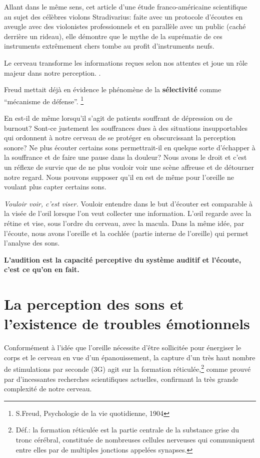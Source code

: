 Allant dans le même sens, cet 
article d'une 
étude franco-américaine scientifique
\autocite{fritz_stradivarius} au sujet des célèbres violons
Stradivarius: faite avec un protocole 
d'écoutes en aveugle avec
des violonistes professionnels et en parallèle avec un public (caché
derrière un rideau), elle démontre que le mythe de la suprématie
de ces instruments extrêmement chers tombe au profit d'instruments
neufs.

Le cerveau 
transforme les informations reçues selon nos attentes et joue un
rôle majeur dans notre perception.
\autocite{lemonde.fr:stradivarius}.
% 
\autocite[p. 43]{roque:lecoute}


 Freud mettait déjà en évidence le phénomène de la
\textbf{sélectivité }comme ``mécanisme de défense''. \footnote{S.Freud,
  Psychologie de la vie quotidienne, 1904}

En est-il de même lorsqu'il s'agit de patients souffrant de dépression
ou de burnout? Sont-ce justement les souffrances dues à des situations
insupportables qui
ordonnent à notre cerveau de se protéger en obscurcissant la
perception sonore?  Ne plus écouter certains
sons permettrait-il en quelque sorte d'échapper à la souffrance et de faire une
pause dans la douleur? Nous avons le droit et c'est un réflexe de
survie que de ne plus vouloir voir une scène affreuse et de détourner
notre regard. Nous pouvons supposer qu'il en est de même pour l'oreille ne voulant plus capter
certains sons.


 \emph{Vouloir voir, c'est viser.}  Vouloir entendre dans le but d'écouter est comparable  à
la visée de l'\oe il lorsque l'on veut collecter une
information. L'\oe il regarde avec la rétine et  vise, sous l'ordre du
cerveau, avec la macula. Dans la même idée, par l'écoute, nous avons
l'oreille et la cochlée (partie interne de l'oreille) qui permet
l'analyse des sons.




 \textbf{ L'audition est la capacité perceptive du système auditif et l'écoute, c'est ce qu'on en fait.}


\section{La perception des sons et l'existence de troubles
  émotionnels}


Conformément à l'idée que l'oreille nécessite d'être sollicitée pour
énergiser le corps et le cerveau en vue d'un épanouissement, la
capture d'un très haut nombre de stimulations par seconde (3G) agit
sur la formation réticulée,\footnote{Déf.: la formation 
réticulée est la partie centrale de la substance grise du tronc cérébral, 
constituée de nombreuses cellules nerveuses qui communiquent entre elles par de 
multiples jonctions appelées synapses.}
comme prouvé par d'incessantes recherches scientifiques actuelles,
confirmant la très grande complexité de notre cerveau.






